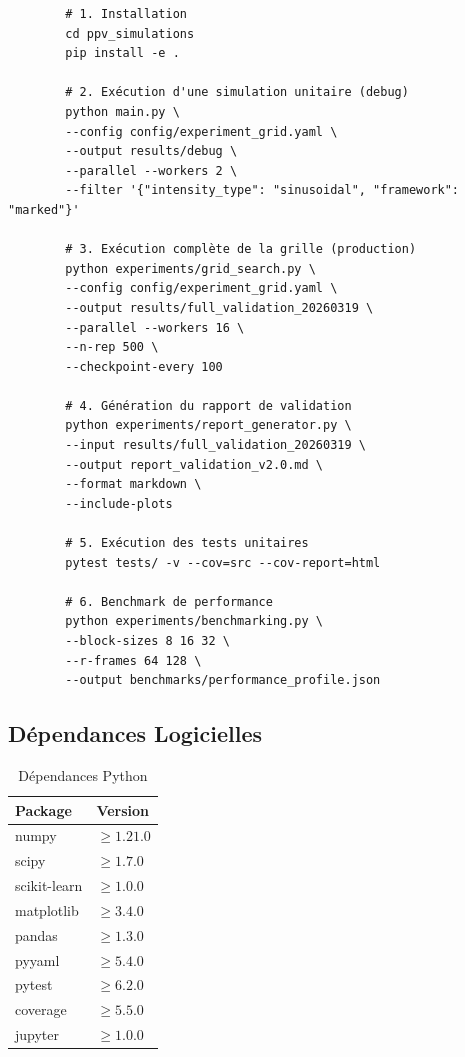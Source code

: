 \documentclass[12pt,a4paper]{article}
\begin{document}
	\begin{verbatim}
		# 1. Installation
		cd ppv_simulations
		pip install -e .
		
		# 2. Exécution d'une simulation unitaire (debug)
		python main.py \
		--config config/experiment_grid.yaml \
		--output results/debug \
		--parallel --workers 2 \
		--filter '{"intensity_type": "sinusoidal", "framework": "marked"}'
		
		# 3. Exécution complète de la grille (production)
		python experiments/grid_search.py \
		--config config/experiment_grid.yaml \
		--output results/full_validation_20260319 \
		--parallel --workers 16 \
		--n-rep 500 \
		--checkpoint-every 100
		
		# 4. Génération du rapport de validation
		python experiments/report_generator.py \
		--input results/full_validation_20260319 \
		--output report_validation_v2.0.md \
		--format markdown \
		--include-plots
		
		# 5. Exécution des tests unitaires
		pytest tests/ -v --cov=src --cov-report=html
		
		# 6. Benchmark de performance
		python experiments/benchmarking.py \
		--block-sizes 8 16 32 \
		--r-frames 64 128 \
		--output benchmarks/performance_profile.json
	\end{verbatim}
	
	\subsection{Dépendances Logicielles}
	\label{subsec:dependances}
	
	\begin{table}[h]
		\centering
		\caption{Dépendances Python}
		\label{tab:dependances}
		\begin{tabular}{@{}ll@{}}
			\toprule
			\textbf{Package} & \textbf{Version} \\
			\midrule
			numpy & $\geq 1.21.0$ \\
			scipy & $\geq 1.7.0$ \\
			scikit-learn & $\geq 1.0.0$ \\
			matplotlib & $\geq 3.4.0$ \\
			pandas & $\geq 1.3.0$ \\
			pyyaml & $\geq 5.4.0$ \\
			pytest & $\geq 6.2.0$ \\
			coverage & $\geq 5.5.0$ \\
			jupyter & $\geq 1.0.0$ \\
			\bottomrule
		\end{tabular}
	\end{table}
	
\end{document}
